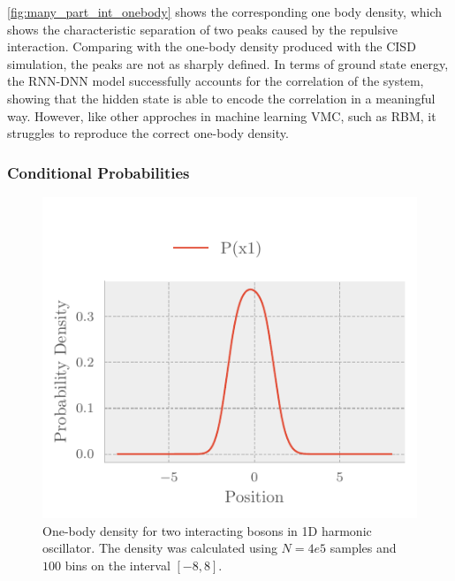 \autoref{fig:many_part_int_onebody} shows the corresponding one body density, which shows the characteristic separation of two peaks caused by the repulsive interaction. Comparing with the one-body density produced with the CISD simulation, the peaks are not as sharply defined. In terms of ground state energy, the RNN-DNN model successfully accounts for the correlation of the system, showing that the hidden state is able to encode the correlation in a meaningful way. However, like other approches in machine learning VMC, such as RBM, it struggles to reproduce the correct one-body density. 

\subsubsection{Conditional Probabilities}

\begin{figure}[H]
	\includegraphics[]{figures/many_part_con1.pdf}
	\caption{One-body density for two interacting bosons in 1D harmonic oscillator. The density was calculated using $N=4e5$ samples and $100$ bins on the interval $[-8,8]$.}
	\label{fig:many_part_con1}
\end{figure}

